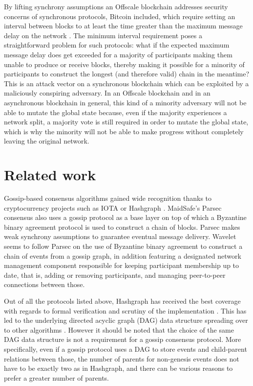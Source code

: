 \documentclass[a4paper,11pt]{article}
\begin{document}
By lifting synchrony assumptions an Offscale blockchain addresses security concerns of synchronous
protocols, Bitcoin included, which require setting an interval between blocks to at least the time
greater than the maximum message delay on the network \cite{rethinking}. The minimum interval
requirement poses a straightforward problem for such protocols: what if the expected maximum message
delay does get exceeded for a majority of participants making them unable to produce or receive
blocks, thereby making it possible for a minority of participants to construct the longest (and
therefore valid) chain in the meantime? This is an attack vector on a synchronous blockchain which
can be exploited by a maliciously conspiring adversary. In an Offscale blockchain and in an
asynchronous blockchain in general, this kind of a minority adversary will not be able to mutate the
global state because, even if the majority experiences a network split, a majority vote is still
required in order to mutate the global state, which is why the minority will not be able to make
progress without completely leaving the original network.


\section{Related work}

Gossip-based consensus algorithms gained wide recognition thanks to cryptocurrency projects such as
IOTA or Hashgraph \cite{hashgraph}. MaidSafe's Parsec \cite{parsec} consensus also uses a gossip
protocol as a base layer on top of which a Byzantine binary agreement protocol is used to construct
a chain of blocks. Parsec makes weak synchrony assumptions to guarantee eventual message
delivery. Wavelet \cite{wavelet} seems to follow Parsec on the use of Byzantine binary agreement to
construct a chain of events from a gossip graph, in addition featuring a designated network
management component responsible for keeping participant membership up to date, that is, adding or
removing participants, and managing peer-to-peer connections between those.

Out of all the protocols listed above, Hashgraph has received the best coverage with regards to
formal verification \cite{hashgraph-coq} and scrutiny of the implementation
\cite{hashgraph-fud}. This has led to the underlying directed acyclic graph (DAG) data structure
spreading over to other algorithms \cite{parsec, lachesis}. However it should be noted that the
choice of the same DAG data structure is not a requirement for a gossip consensus protocol. More
specifically, even if a gossip protocol uses a DAG to store events and child-parent relations
between those, the number of parents for non-genesis events does not have to be exactly two as in
Hashgraph, and there can be various reasons to prefer a greater number of parents.
\end{document}
